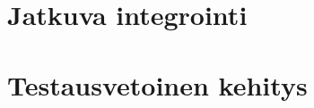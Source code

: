 \section{Jatkuva integrointi} \label{ch:07_jatkuva_integrointi}


\section{Testausvetoinen kehitys} \label{ch:07_testausvetoinen_kehitys}


